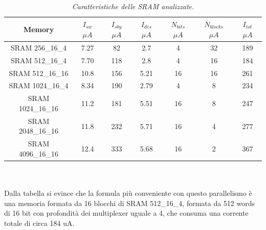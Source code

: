 \begin{table}[!h]\footnotesize
	\centering
	\begin{tabular}{|c|c|c|c|c|c|c|}
		\hline
		\textbf{Memory} & \textbf{$I_{sw}$ $\mu A$}& \textbf{$I_{sby}$ $\mu A$} & \textbf{$I_{des}$ $\mu A$} & \textbf{$N_{bits}$ $\mu A$} & \textbf{$N_{blocks}$ $\mu A$} &
		\textbf{$I_{tot}$ $\mu A$}
		\\
		\hline
		SRAM 256\_16\_4 & 7.27 & 82 &2.7 & 4 & 32 & 189\\
		SRAM 512\_16\_4 & 7.70 & 118 & 2.8 &  4 & 16 & 184\\
		SRAM 512\_16\_16 & 10.8 & 156 & 5.21 & 16 & 16 & 261\\
		SRAM 1024\_16\_4 & 8.34 & 190 & 2.79 & 4 & 8 & 234\\
		SRAM 1024\_16\_16 & 11.2 & 181 & 5.51 & 16 & 8 & 247\\
		SRAM 2048\_16\_16 & 11.8 & 232 & 5.71 & 16 & 4 & 277\\
		SRAM 4096\_16\_16 & 12.4 & 333 & 5.68 & 16  & 2 & 367\\
		\hline
	\end{tabular}
	\caption{\textit{Caratteristiche delle SRAM analizzate.}}
	\label{Tab5_25}
\end{table}
\\
\\
Dalla tabella si evince che la formula più conveniente con questo parallelismo è una memoria formata da 16 blocchi di  SRAM 512\_16\_4, formata da 512  words  di 16 bit con profondità dei multiplexer uguale a 4, che consuma una corrente totale di circa 184 uA.
